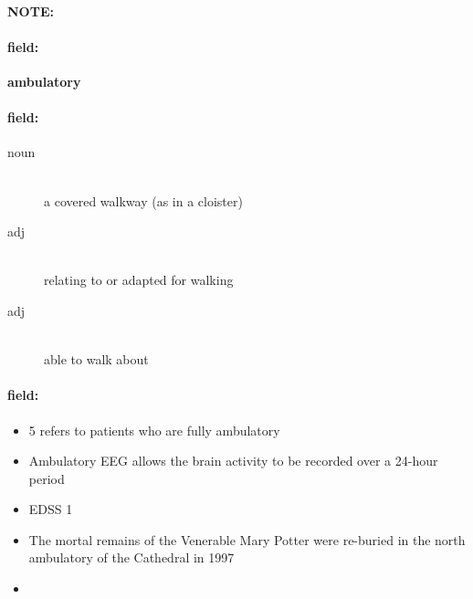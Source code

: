 \documentclass[12pt]{article}
\newenvironment{note}{\paragraph{NOTE:}}{}
\newenvironment{field}{\paragraph{field:}}{}
\begin{document}
\begin{note}
\begin{field}
\textbf{\large ambulatory}
\end{field}


\begin{field}
\begin{description}
\item[noun] \hfill \\ 
a covered walkway (as in a cloister)

\item[adj] \hfill \\ 
relating to or adapted for walking

\item[adj] \hfill \\ 
able to walk about

\end{description}
\end{field}

\begin{field}
\begin{itemize}
\item 5 refers to patients who are fully ambulatory
\item Ambulatory EEG allows the brain activity to be recorded over a 24-hour period
\item EDSS 1
\item The mortal remains of the Venerable Mary Potter were re-buried in the north ambulatory of the Cathedral in 1997
\item 
\end{itemize}
\end{field}
\end{note}
\end{document}
